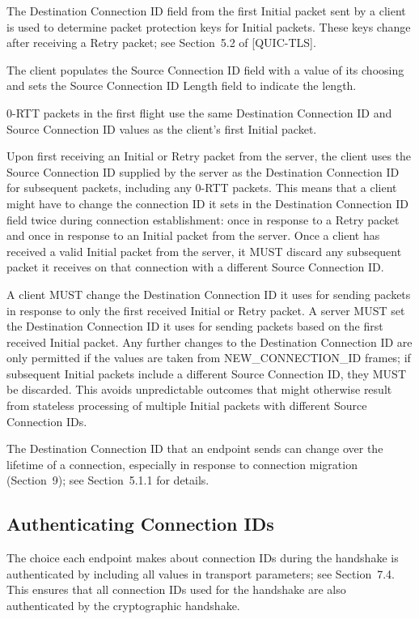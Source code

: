 \documentclass{article}
\begin{document}
The Destination Connection ID field from the first Initial packet sent by a client is used to determine packet protection keys for Initial packets.  These keys change after receiving a Retry packet; see Section~5.2 of [QUIC-TLS].

The client populates the Source Connection ID field with a value of its choosing and sets the Source Connection ID Length field to indicate the length.

0-RTT packets in the first flight use the same Destination Connection ID and Source Connection ID values as the client's first Initial packet.

Upon first receiving an Initial or Retry packet from the server, the client uses the Source Connection ID supplied by the server as the Destination Connection ID for subsequent packets, including any 0-RTT packets.  This means that a client might have to change the connection ID it sets in the Destination Connection ID field twice during connection establishment: once in response to a Retry packet and once in response to an Initial packet from the server.  Once a client has received a valid Initial packet from the server, it MUST discard any subsequent packet it receives on that connection with a different Source Connection ID.

A client MUST change the Destination Connection ID it uses for sending packets in response to only the first received Initial or Retry packet.  A server MUST set the Destination Connection ID it uses for sending packets based on the first received Initial packet. Any further changes to the Destination Connection ID are only permitted if the values are taken from NEW\_CONNECTION\_ID frames; if subsequent Initial packets include a different Source Connection ID, they MUST be discarded.  This avoids unpredictable outcomes that might otherwise result from stateless processing of multiple Initial packets with different Source Connection IDs.

The Destination Connection ID that an endpoint sends can change over the lifetime of a connection, especially in response to connection migration (Section~9); see Section~5.1.1 for details.

\subsection{Authenticating Connection IDs}

The choice each endpoint makes about connection IDs during the handshake is authenticated by including all values in transport parameters; see Section~7.4.  This ensures that all connection IDs used for the handshake are also authenticated by the cryptographic handshake.
\end{document}
